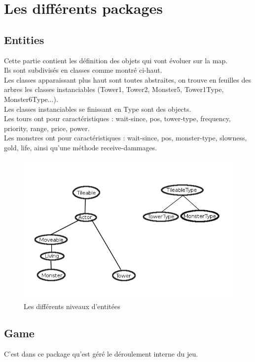 \documentclass{article}
\begin{document}
\section{Les différents packages}

\subsection{Entities}
Cette partie contient les définition des objets qui vont évoluer sur la map.\\
Ils sont subdivisés en classes comme montré ci-haut.\\
Les classes apparaissant plus haut sont toutes abstraites, on trouve en feuilles des arbres les classes instanciables (Tower1, Tower2, Monster5, Tower1Type, Monster6Type...).\\
Les classes instanciables se finissant en Type sont des objects.\\
Les tours ont pour caractéristiques : wait-since, pos, tower-type, frequency, priority, range, price, power. \\
Les monstres ont pour caractéristiques : wait-since, pos, monster-type, slowness, gold, life, ainsi qu'une méthode receive-dammages.


\begin{figure}[h]
\center
\includegraphics[scale = 0.4]{Entities.png}
\caption{Les différents niveaux d'entitées}
\end{figure}

\subsection{Game}
C'est dans ce package qu'est géré le déroulement interne du jeu. 
\end{document}
